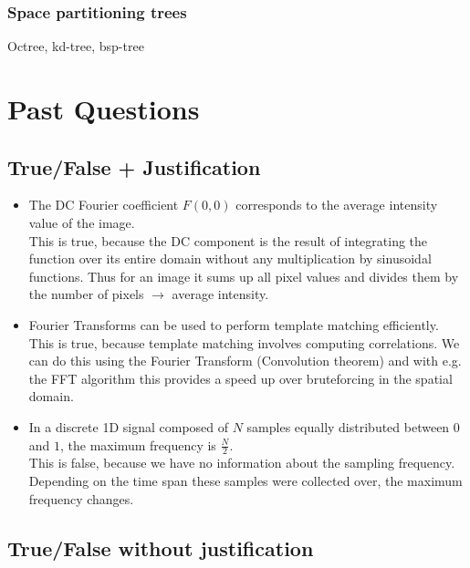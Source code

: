 \documentclass[a4paper,10pt]{article}
\newcommand{\cmark}{\text{\ding{51}}}
\newcommand{\xmark}{\text{\ding{55}}}
\begin{document}
\subsubsection{Space partitioning trees} Octree, kd-tree, bsp-tree

\section{Past Questions}
\subsection{True/False + Justification} 
\begin{itemize}
    \item[\cmark] The DC Fourier coefficient \( F(0,0) \) corresponds to the average intensity value of the image.\\
    This is true, because the DC component is the result of integrating the function over its entire domain without any multiplication by sinusoidal functions. Thus for an image it sums up all pixel values and divides them by the number of pixels \( \to  \) average intensity.
    \item[\cmark] Fourier Transforms can be used to perform template matching efficiently.\\
    This is true, because template matching involves computing correlations. We can do this using the Fourier Transform (Convolution theorem) and with e.g. the FFT algorithm this provides a speed up over bruteforcing in the spatial domain.
    \item[\xmark] In a discrete 1D signal composed of \( N \) samples equally distributed between \( 0 \) and \( 1 \), the maximum frequency is \( \frac{N}{2} \).\\
    This is false, because we have no information about the sampling frequency. Depending on the time span these samples were collected over, the maximum frequency changes.
\end{itemize}

\subsection{True/False without justification}
\end{document}
